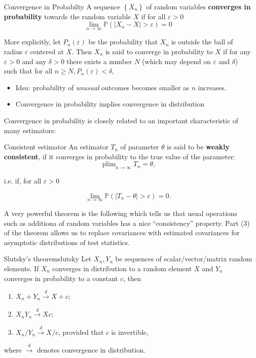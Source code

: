 \documentclass[11pt, %
	oneside, %
	english, %
	onehalfspacing, %
	]{article} %
\numberwithin{equation}{section}
\begin{document}
\begin{definition}{Convergence in Probabilty}{}
    A sequence $\left\{X_n\right\}$ of random variables \textbf{converges in probability} towards the random variable $X$ if for all $\varepsilon>0$
    $$
    \lim _{n \rightarrow \infty} \mathbb{P}\left(\left|X_n-X\right|>\varepsilon\right)=0
    $$
\end{definition}

More explicitly, let $P_n(\varepsilon)$ be the probability that $X_n$ is outside the ball of radius $\varepsilon$ centered at $X$. Then $X_n$ is said to converge in probability to $X$ if for any $\varepsilon>0$ and any $\delta>0$ there exists a number $N$ (which may depend on $\varepsilon$ and $\delta$) such that for all $n \geq N, P_n(\varepsilon)<\delta$,


\begin{itemize}
    \item Idea: probability of \emph{unusual} outcomes becomes smaller as $n$ increases.
    \item Convergence in probability implies convergence in distribution
\end{itemize}

Convergence in probability is closely related to an important characteristic of many estimators:

\begin{definition}{Consistent estimator}{}
    An estimator $T_n$ of parameter $\theta$ is said to be \textbf{weakly consistent}, if it converges in probability to the true value of the parameter:
    $$
    \operatorname{plim}_{n \rightarrow \infty} T_n=\theta,
    $$

    i.e. if, for all $\varepsilon>0$

    $$
    \lim _{n \rightarrow \infty} \mathbb{P}\left(\left|T_n-\theta\right|>\varepsilon\right)=0.
    $$
\end{definition}

A very powerful theorem is the following which tells us that usual operations such as additiona of random variables has a nice ``consistency'' property. Part (3) of the theorem allows us to replace covariances with estimated covariances for asymptotic distributions of test statistics.

\begin{theorem}{Slutsky's theorem}{slutsky}
    Let $X_n, Y_n$ be sequences of scalar/vector/matrix random elements. If $X_n$ converges in distribution to a random element $X$ and $Y_n$ converges in probability to a constant $c$, then
    \begin{enumerate}
        \item $X_n+Y_n \xrightarrow{d} X+c ;$
        \item $X_n Y_n \xrightarrow{d} X c ;$
        \item $X_n / Y_n \xrightarrow{d} X / c$, provided that $c$ is invertible,
    \end{enumerate}
    where $\stackrel{d}{\rightarrow}$ denotes convergence in distribution.
\end{theorem}
\end{document}
